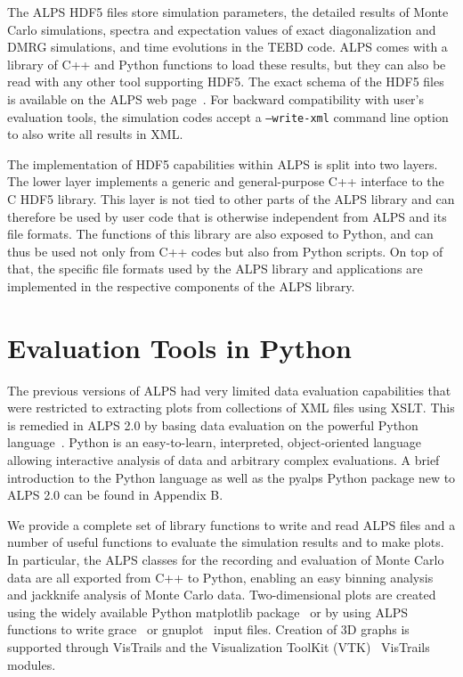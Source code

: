 \documentclass[12pt]{iopart}
\begin{document}
The ALPS HDF5 files store simulation parameters, the detailed results of Monte Carlo simulations, spectra and expectation values of exact diagonalization and DMRG simulations, and time evolutions in the TEBD code. ALPS comes with a library of C++ and Python functions to load these results, but they can also be read with any other tool supporting HDF5. The exact schema of the HDF5 files is available on the ALPS web page~\cite{alps}. For backward compatibility with user's evaluation tools, the simulation codes accept a {\tt --write-xml} command line option to also write all results in XML.

The implementation of HDF5 capabilities within ALPS is split into two layers. The lower layer implements a generic and general-purpose C++ interface to the C HDF5 library. This layer is not tied to other parts of the ALPS library and can therefore be used by user code that is otherwise independent from ALPS and its file formats. The functions of this library are also exposed to Python, and can thus be used not only from C++ codes but also from Python scripts. On top of that, the specific file formats used by the ALPS library and applications are implemented in the respective components of the ALPS library.

\section{Evaluation Tools in Python} \label{sct:python}

The previous versions of ALPS had very limited data evaluation capabilities that were restricted to extracting plots from collections of XML files using XSLT. This is remedied in ALPS 2.0 by basing data evaluation on the powerful Python language~\cite{python}. Python is an easy-to-learn, interpreted, object-oriented language allowing interactive analysis of data and arbitrary complex evaluations. A brief introduction to the Python language as well as the pyalps Python package new to ALPS 2.0 can be found in Appendix B.

We provide a complete set of library functions to write and read ALPS files and a number of useful functions to evaluate the simulation results and to make plots. In particular, the ALPS classes for the recording and evaluation of Monte Carlo data are all exported from C++ to Python, enabling an easy binning analysis~\cite{Ambegaokar2010} and jackknife analysis of Monte Carlo data.
Two-dimensional plots are created using the widely available Python matplotlib package~\cite{matplotlib} or by using ALPS functions to write grace~\cite{grace} or gnuplot~\cite{gnuplot} input files. Creation of 3D graphs is supported through VisTrails and the Visualization ToolKit (VTK)~\cite{vtk} VisTrails modules.
\end{document}
